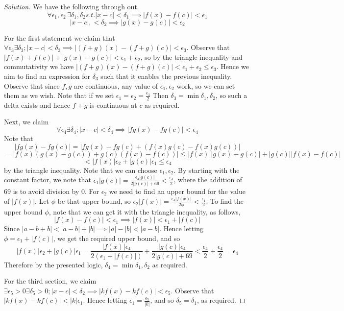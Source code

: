 \begin{proof}[Solution]
  We have the following through out. 
  \[\forall \epsilon_1,\epsilon_2\, \exists\delta_1,\delta_2 s.t. |x-c|<\delta_1 \implies
  |f(x)-f(c)|<\epsilon_1\]
  \[|x-c|,<\delta_2 \implies |g(x)-g(c)|<\epsilon_2\]

  For the first statement we claim that $\forall \epsilon_3\exists\delta_3 ; 
  |x-c|<\delta_3\implies |(f+g)(x)-(f+g)(c)|<\epsilon_3$. Observe that
  $|f(x)+f(c)|+|g(x)-g(c)|<\epsilon_1+\epsilon_2$, so by the triangle inequality and
  commutativity we have $|(f+g)(x) - (f+g)(c)|<\epsilon_1+\epsilon_2\leq \epsilon_3$.
  Hence we aim to find an expression for $\delta_3$ such that it enables the previous
  inequality. Observe that since $f,g$ are continuous, any value of
  $\epsilon_1,\epsilon_2$ work, so we can set them as we wish. Note that if we set
  $\epsilon_1=\epsilon_2=\frac{\epsilon_3}{2}$
  Then $\delta_3=\min{\delta_1,\delta_2}$, so such a delta exists and hence $f+g$ is
  continuous at $c$ as required.

  Next, we claim \[\forall\epsilon_4\exists\delta_4;|x-c|<\delta_4\implies
  |fg(x)-fg(c)|<\epsilon_4\] Note that 
  \[|fg(x)-fg(c)|=|fg(x)-fg(c) + (f(x)g(c)-f(x)g(c))|\]
  \[= |f(x)(g(x)-g(c)) + g(c)(f(x)-f(c))| \leq |f(x)||g(x)-g(c)| + |g(c)||f(x)-f(c)| \]
  \[< |f(x)|\epsilon_2 + |g(c)|\epsilon_1 \leq \epsilon_4\] by the triangle inequality.  Note
  that we can choose $\epsilon_1,\epsilon_2$. By starting with the constant factor, we
  note that $\epsilon_1|g(c)|=\frac{\epsilon_4|g(c)|}{2|g(c)|+69}<\frac{\epsilon_4}{2}$,
  where the addition of $69$ is to avoid division by $0$. For $\epsilon_2$ we need to find
  an upper bound for the value of $|f(x)|$. Let $\phi$ be that upper bound, so
  $\epsilon_2|f(x)|=\frac{\epsilon_4|f(x)|}{2\phi}<\frac{\epsilon_4}{2}$. To find the
  upper bound $\phi$, note that we can get it with the triangle inequality, as follows,
  \[|f(x)-f(c)|<\epsilon_1\implies|f(x)|<\epsilon_1+|f(c)|\] Since $|a-b+b| <
  |a-b|+|b|\implies |a|-|b|<|a-b|$. Hence letting $\phi=\epsilon_1+|f(c)|$, we get the
  required upper bound, and so \[|f(x)|\epsilon_2+|g(c)|\epsilon_1 =
    \frac{|f(x)|\epsilon_4}{2(\epsilon_1+|f(c)|)}+\frac{|g(c)|\epsilon_4}{2|g(c)|+69} <
  \frac{\epsilon_4}{2} + \frac{\epsilon_4}{2} = \epsilon_4\] Therefore by the presented
  logic, $\delta_4=\min{\delta_1,\delta_2}$ as required.


  For the third section, we claim $\exists\epsilon_5>0\exists\delta_5>0;
  |x-c|<\delta_2\implies|kf(x)-kf(c)|<\epsilon_5$. Observe that
  $|kf(x)-kf(c)|<|k|\epsilon_1$. Hence letting $\epsilon_1=\frac{\epsilon_5}{|k|}$, and so
  $\delta_5=\delta_1$, as required.


\end{proof}
